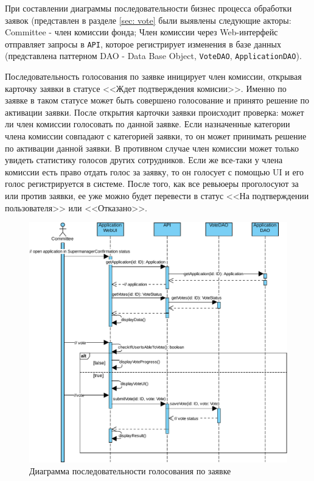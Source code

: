 \documentclass[a4paper,12pt,reqno]{article}
\begin{document}
При составлении диаграммы последовательности бизнес процесса обработки заявок (представлен в разделе \ref{sec: vote} были выявлены следующие акторы: Committee - член комиссии фонда; Член комиссии через Web-интерфейс отправляет запросы в \texttt{API}, которое регистрирует изменения в базе данных (представлена паттерном DAO - Data Base Object, \texttt{VoteDAO}, \texttt{ApplicationDAO}).

Последовательность голосования по заявке иницирует член комиссии, открывая карточку заявки в статусе <<Ждет подтверждения комисии>>. Именно по заявке в таком статусе может быть совершено голосование и принято решение по активации заявки.  После открытия карточки заявки происходит проверка: может ли член комиссии голосовать по данной заявке. Если назначенные категории члена комиссии совпадают с категорией заявки, то он может принимать решение по активации данной заявки. В противном случае член комиссии может только увидеть статистику голосов других сотрудников. Если же все-таки у члена комиссии есть право отдать голос за заявку, то он голосует с помощью UI и его голос регистрируется в системе. После того, как все ревьюеры проголосуют за или против заявки, ее уже можно будет перевести в статус <<На подтверждении пользователя>> или <<Отказано>>.  

\begin{figure}[H]
		\centering
		\includegraphics[width = 0.95\linewidth]{img/vote_seq.pdf}
		\caption{Диаграмма последовательности голосования по заявке}
		\label{pic: sequence_vote}
\end{figure}
\end{document}
